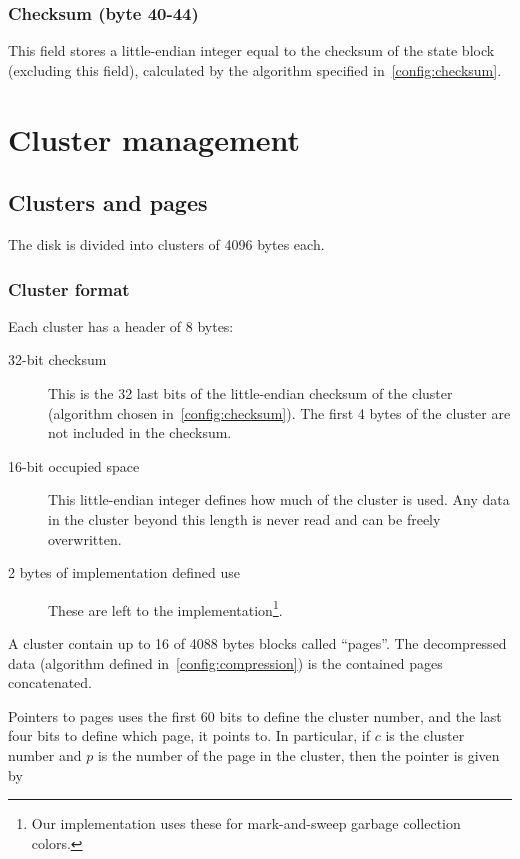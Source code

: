 \documentclass[11pt,a4paper]{report}
\newcommand{\clusterheader}{8 }
\newcommand{\clustersize}{4096 }
\newcommand{\maxpagesincluster}{16 }
\newcommand{\pagesize}{4088 } %
\begin{document}
        \subsection{Checksum (byte 40-44)}
        This field stores a little-endian integer equal to the checksum of the
        state block (excluding this field), calculated by the algorithm
        specified in~\ref{config:checksum}.

    \chapter{Cluster management}

    \section{Clusters and pages}
        The disk is divided into clusters of \clustersize bytes each.

        \subsection{Cluster format}
        Each cluster has a header of \clusterheader bytes:

        \begin{description}
            \item [32-bit checksum] This is the 32 last bits of the
                little-endian checksum of the cluster (algorithm
                chosen in~\ref{config:checksum}). The first 4 bytes of
                the cluster are not included in the checksum.
            \item [16-bit occupied space] This little-endian integer defines
                how much of the cluster is used. Any data in the cluster beyond
                this length is never read and can be freely overwritten.
            \item [2 bytes of implementation defined use] These are left to the
                implementation\footnote{Our implementation uses these for
                mark-and-sweep garbage collection colors.}.
        \end{description}

        A cluster contain up to \maxpagesincluster of \pagesize bytes blocks
        called ``pages''. The decompressed data (algorithm defined
        in~\ref{config:compression}) is the contained pages concatenated.

        Pointers to pages uses the first 60 bits to define the cluster number,
        and the last four bits to define which page, it points to. In
        particular, if $c$ is the cluster number and $p$ is the number of the
        page in the cluster, then the pointer is given by
\end{document}

